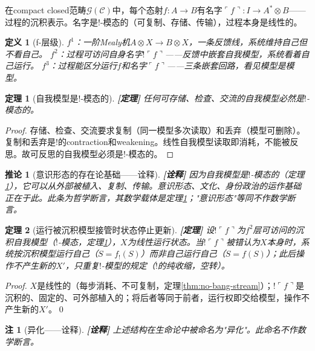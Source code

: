 \documentclass[11pt,a4paper]{article}
\newtheorem{definition}{定义}
\newtheorem{theorem}{定理}
\newtheorem{corollary}{推论}
\newtheorem{remark}{注}
\newcommand{\lvl}[1]{\hfill\textbf{\footnotesize[#1]}}
\newcommand{\lvP}{\lvl{定理}}
\newcommand{\lvI}{\lvl{诠释}}
\newcommand{\bang}{{!}}
\newcommand{\tensor}{\otimes}
\begin{document}
在compact closed范畴$\mathcal{G}(\mathcal{C})$中，每个态射$f:A\to B$有名字$\ulcorner f\urcorner:I\to A^*\tensor B$——过程的沉积表示。名字是$\bang$-模态的（可复制、存储、传输），过程本身是线性的。

\begin{definition}[f-层级]
$f^1$：一阶Mealy机$A\tensor X\to B\tensor X$，一条反馈线，系统维持自己但不看自己。
$f^2$：过程可访问自身名字$\bang\ulcorner f\urcorner$——反馈中嵌套自我模型，系统看着自己运行。
$f^3$：过程能区分运行$f$和名字$\ulcorner f\urcorner$——三条嵌套回路，看见模型是模型。
\end{definition}

\begin{theorem}[自我模型是!-模态的]\label{thm:self-model-bang}\lvP
任何可存储、检查、交流的自我模型必然是$\bang$-模态的。
\end{theorem}

\begin{proof}
存储、检查、交流要求复制（同一模型多次读取）和丢弃（模型可删除）。复制和丢弃是$\bang$的contraction和weakening。线性自我模型读取即消耗，不能被反思。故可反思的自我模型必须是$\bang$-模态的。
\end{proof}

\begin{corollary}[意识形态的存在论基础——诠释]\lvI
因为自我模型是$\bang$-模态的（定理\ref{thm:self-model-bang}），它可以从外部被植入、复制、传输。意识形态、文化、身份政治的运作基础正在于此。此条为哲学断言，其数学载体是定理\ref{thm:self-model-bang}；"意识形态"等同不作数学断言。
\end{corollary}

\begin{theorem}[运行被沉积模型接管时状态停止更新]\label{thm:alienation-mistake}\lvP
设$\bang\ulcorner f\urcorner$为$f^2$层可访问的沉积自我模型（$\bang$-模态，定理\ref{thm:self-model-bang}），$X$为线性运行状态。当$\bang\ulcorner f\urcorner$被错认为$X$本身时，系统按沉积模型运行自己（$S=f_{\bang}(S)$）而非自己运行自己（$S=f(S)$）；此后操作不产生新的$X'$，只重复$\bang$-模型的规定（$\bang$的纯收缩，空转）。
\end{theorem}

\begin{proof}
$X$是线性的（每步消耗、不可复制，定理\ref{thm:no-bang-stream}）；$\bang\ulcorner f\urcorner$是沉积的、固定的、可外部植入的；将后者等同于前者，运行权即交给模型，操作不产生新的$X'$。\qed
\end{proof}

\begin{remark}[异化——诠释]\lvI
上述结构在生命论中被命名为"异化"。此命名不作数学断言。
\end{remark}
\end{document}
